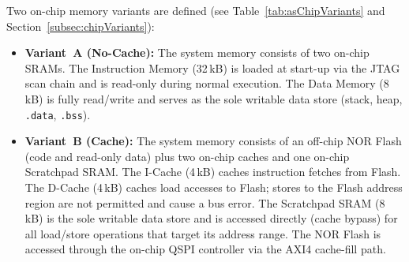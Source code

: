 Two on-chip memory variants are defined (see Table~\ref{tab:asChipVariants}
and Section~\ref{subsec:chipVariants}):

\begin{itemize}
  \item \textbf{Variant~A (No-Cache):}
    The system memory consists of two on-chip SRAMs.
    The Instruction Memory (32\,kB) is loaded at start-up via the JTAG scan
    chain and is read-only during normal execution.
    The Data Memory (8\,kB) is fully read/write and serves as the sole
    writable data store (stack, heap, \texttt{.data}, \texttt{.bss}).

  \item \textbf{Variant~B (Cache):}
    The system memory consists of an off-chip NOR Flash (code and read-only
    data) plus two on-chip caches and one on-chip Scratchpad SRAM.
    The I-Cache (4\,kB) caches instruction fetches from Flash.
    The D-Cache (4\,kB) caches load accesses to Flash; stores to the Flash
    address region are not permitted and cause a bus error.
    The Scratchpad SRAM (8\,kB) is the sole writable data store and is
    accessed directly (cache bypass) for all load/store operations that
    target its address range.
    The NOR Flash is accessed through the on-chip QSPI controller via the
    AXI4 cache-fill path.
\end{itemize}
